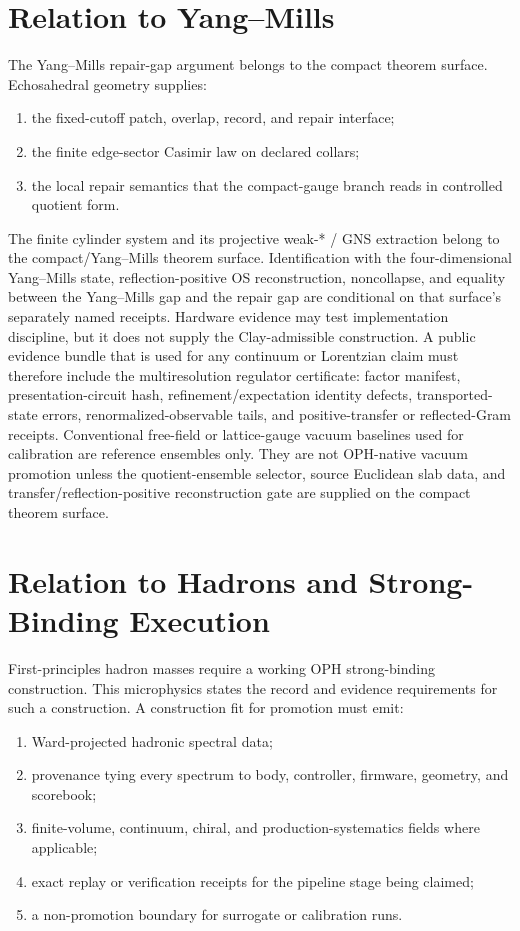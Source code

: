\documentclass[11pt]{article}
\theoremstyle{remark}
\theoremstyle{plain}
\begin{document}
\section{Relation to Yang--Mills}

The Yang--Mills repair-gap argument belongs to the compact theorem surface. Echosahedral geometry
supplies:
\begin{enumerate}[leftmargin=2em]
\item the fixed-cutoff patch, overlap, record, and repair interface;
\item the finite edge-sector Casimir law on declared collars;
\item the local repair semantics that the compact-gauge branch reads in controlled
quotient form.
\end{enumerate}

The finite cylinder system and its projective weak-* / GNS extraction belong to the
compact/Yang--Mills theorem surface. Identification with the four-dimensional Yang--Mills state,
reflection-positive OS reconstruction, noncollapse, and equality between the Yang--Mills gap and
the repair gap are conditional on that surface's separately named receipts. Hardware evidence may test implementation discipline, but it
does not supply the Clay-admissible construction. A public evidence bundle that is used for any
continuum or Lorentzian claim must therefore include the multiresolution regulator certificate:
factor manifest, presentation-circuit hash, refinement/expectation identity defects,
transported-state errors, renormalized-observable tails, and positive-transfer or reflected-Gram
receipts.
Conventional free-field or lattice-gauge vacuum baselines used for calibration are
reference ensembles only. They are not OPH-native vacuum promotion unless the quotient-ensemble
selector, source Euclidean slab data, and transfer/reflection-positive reconstruction gate are
supplied on the compact theorem surface.

\section{Relation to Hadrons and Strong-Binding Execution}

First-principles hadron masses require a working OPH strong-binding construction. This microphysics states the
record and evidence requirements for such a construction. A construction fit for promotion must emit:
\begin{enumerate}[leftmargin=2em]
\item Ward-projected hadronic spectral data;
\item provenance tying every spectrum to body, controller, firmware, geometry, and scorebook;
\item finite-volume, continuum, chiral, and production-systematics fields where applicable;
\item exact replay or verification receipts for the pipeline stage being claimed;
\item a non-promotion boundary for surrogate or calibration runs.
\end{enumerate}
\end{document}
